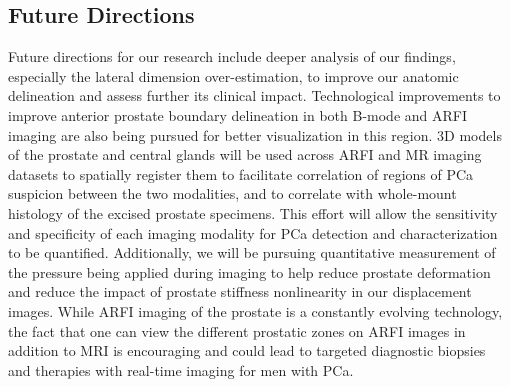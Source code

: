 \subsection{Future Directions}
Future directions for our research include deeper analysis of our findings,
especially the lateral dimension over-estimation, to improve our anatomic
delineation and assess further its clinical impact.  Technological improvements
to improve anterior prostate boundary delineation in both B-mode and ARFI
imaging are also being pursued for better visualization in this region.  3D
models of the prostate and central glands will be used across ARFI and MR
imaging datasets to spatially register them to facilitate correlation of
regions of PCa suspicion between the two modalities, and to correlate with
whole-mount histology of the excised prostate specimens.  This effort will
allow the sensitivity and specificity of each imaging modality for PCa
detection and characterization to be quantified.  Additionally, we will be
pursuing quantitative measurement of the pressure being applied during imaging
to help reduce prostate deformation and reduce the impact of prostate stiffness
nonlinearity in our displacement images.  While ARFI imaging of the prostate is
a constantly evolving technology, the fact that one can view the different
prostatic zones on ARFI images in addition to MRI is encouraging and could lead
to targeted diagnostic biopsies and therapies with real-time imaging for men
with PCa. 

